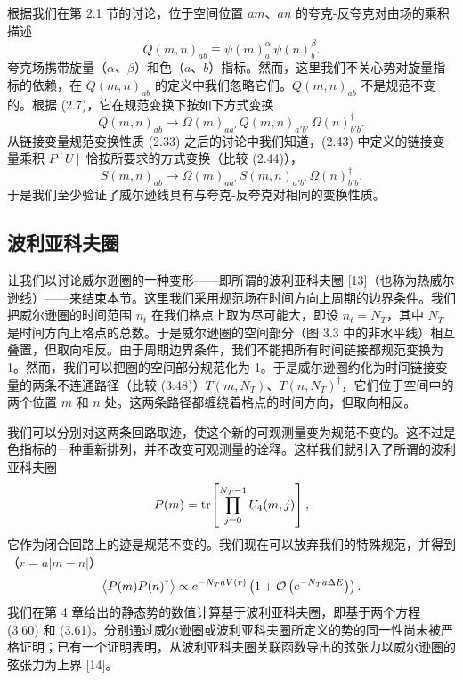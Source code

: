 根据我们在第 2.1 节的讨论，位于空间位置 $am$、$an$ 的夸克-反夸克对由场的乘积描述
\begin{equation}
  Q(m, n)_{ab} \equiv \psi(m)^{\alpha}_{a}\,\psi(n)^{\beta}_{b} .
\end{equation}
夸克场携带旋量（$\alpha$、$\beta$）和色（$a$、$b$）指标。然而，这里我们不关心势对旋量指标的依赖，在 $Q(m, n)_{ab}$ 的定义中我们忽略它们。$Q(m, n)_{ab}$ 不是规范不变的。根据 (2.7)，它在规范变换下按如下方式变换
\begin{equation}
  Q(m, n)_{ab} \to \Omega(m)_{aa'}\,Q(m, n)_{a'b'}\,\Omega(n)^\dagger_{b'b} .
\end{equation}
从链接变量规范变换性质 (2.33) 之后的讨论中我们知道，(2.43) 中定义的链接变量乘积 $P[U]$ 恰按所要求的方式变换（比较 (2.44)），
\begin{equation}
  S(m, n)_{ab} \to \Omega(m)_{aa'}\,S(m, n)_{a'b'}\,\Omega(n)^\dagger_{b'b} .
\end{equation}
于是我们至少验证了威尔逊线具有与夸克-反夸克对相同的变换性质。

\subsection{波利亚科夫圈}

让我们以讨论威尔逊圈的一种变形——即所谓的波利亚科夫圈 [13]（也称为热威尔逊线）——来结束本节。这里我们采用规范场在时间方向上周期的边界条件。我们把威尔逊圈的时间范围 $n_t$ 在我们格点上取为尽可能大，即设 $n_t = N_T$，其中 $N_T$ 是时间方向上格点的总数。于是威尔逊圈的空间部分（图 3.3 中的非水平线）相互叠置，但取向相反。由于周期边界条件，我们不能把所有时间链接都规范变换为 1。然而，我们可以把圈的空间部分规范化为 1。于是威尔逊圈约化为时间链接变量的两条不连通路径（比较 (3.48)）$T(m, N_T)$、$T(n, N_T)^\dagger$，它们位于空间中的两个位置 $m$ 和 $n$ 处。这两条路径都缠绕着格点的时间方向，但取向相反。

我们可以分别对这两条回路取迹，使这个新的可观测量变为规范不变的。这不过是色指标的一种重新排列，并不改变可观测量的诠释。这样我们就引入了所谓的波利亚科夫圈
\begin{equation}
  P(m) = \operatorname{tr}\!\left[\prod_{j=0}^{N_T-1} U_4(m, j)\right] ,
\end{equation}
它作为闭合回路上的迹是规范不变的。我们现在可以放弃我们的特殊规范，并得到（$r = a|m - n|$）
\begin{equation}
  \left\langle P(m)P(n)^\dagger \right\rangle \propto e^{-N_T a V(r)}\left(1 + \mathcal{O}\left(e^{-N_T a\Delta E}\right)\right) .
\end{equation}
我们在第 4 章给出的静态势的数值计算基于波利亚科夫圈，即基于两个方程 (3.60) 和 (3.61)。分别通过威尔逊圈或波利亚科夫圈所定义的势的同一性尚未被严格证明；已有一个证明表明，从波利亚科夫圈关联函数导出的弦张力以威尔逊圈的弦张力为上界 [14]。

